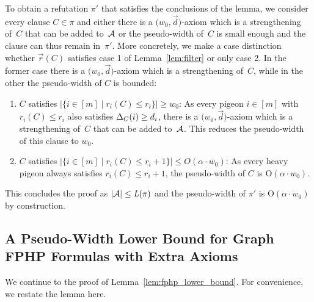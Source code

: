 \documentclass{article}
\newcommand{\bigoh}[1]{\mathrm{O} ( #1 )}
\newcommand{\N}         {\mathbb{N}}
\providecommand{\abs}[1]{\lvert#1\rvert}
\providecommand{\Abs}[1]{\bigl\lvert#1\bigr\rvert}
\newcommand{\set}[1]{\{ #1 \}}
\newcommand{\setdescr}[3][\mid]{\set{ #2 #1 #3 }}
\newcommand{\setsize}[1]{\lvert#1\rvert}
\newcommand{\disjointunion}{\overset{.}{\cup}}
\newcommand{\reflem}[1]{Lemma~\ref{#1}}
\newenvironment{restatablelem}[1]
  {\renewcommand\theinnercustomthm{#1}\innercustomthm}
  {\endinnercustomthm}
\newcommand{\refpi}{\pi}
\newcommand{\genericformsmall}[2]{\mathit{#1}( #2 )}
\newcommand{\length}[1]{\genericformsmall{L}{#1}}
\newcommand{\width}[2][]{\genericformsmall{W_{#1}}{#2}}
\newcommand{\formulaformat}[1]{\mathit{#1}}
\newcommand{\graphfphpnot}[1][G]{\formulaformat{FPHP}({#1})}
\newcommand{\heavy}{heavy\xspace}
\newcommand{\GFPHP}{G\text{-}FPHP}
\renewcommand{\GFPHP}{\graphfphpnot[G]}
\renewcommand{\deg}[2][XXXXXXXXXXXX]{\Delta_{#1}(#2)}
\newcommand{\diff}{\xi}
\newcommand{\cdiff}{4}
\newcommand{\GdegMax}{\Delta}
\newcommand{\V}[1][]{V_{#1}}
\newcommand{\Vp}{\V[P]}
\newcommand{\Vh}{\V[H]}
\newcommand{\Ax}{\ensuremath\mathcal{A}}
\newcommand{\thr}[1]{ \ensuremath d_{{#1}} }
\newcommand{\vecthr}{\vec{d}}
\newcommand{\vecthrdef}[1]{\vecthr = \left(\thr{1}, \ldots, \thr{#1}\right)}
\newcommand{\adv}[1]{\delta_{{#1}}}
\newcommand{\vecadv}{\vec{\delta}}
\newcommand{\vecadvdef}[1]{\vecadv = \left(\adv{1}, \ldots, \adv{#1}\right)}
\newcommand{\fakeaxiom}{$\bigl( w_0, \vecthr \bigr)$-axiom\xspace}
\newcommand{\pseudowidth}{pseudo-width\xspace}
\newcommand{\PSEUDOWIDTH}{Pseudo-Width\xspace}
\renewcommand{\width}[1]{\ensuremath w_{\vecthr,\vecadv}( #1 )}
\newcommand{\ri}[1]{r_{#1}}
\newcommand{\riof}[2]{r_{#2}(#1)}
\newcommand{\vecrof}[1]{\vec{r}(#1)}
\newcommand{\squeezesubsection}[1]{\subsection{#1}}
\numberwithin{equation}{section}
\begin{document}
To obtain a refutation $\refpi'$ that satisfies the conclusions of the lemma,
we consider every clause $C \in \refpi$ and either there is a
\fakeaxiom which is a strengthening of~$C$ that can be added to~$\Ax$ or
the \pseudowidth of~$C$ is small enough and the clause can thus remain
in~$\refpi'$.  More concretely, we make a case distinction whether
$\vecrof{C}$ satisfies case 1 of \reflem{lem:filter} or only case
2. In the former case
there is a \fakeaxiom which is a strengthening of~$C$, while in the
other
the \pseudowidth of $C$ is bounded: \begin{enumerate}
  \item
    $C$ satisfies 
    $\Abs{ \setdescr{ i \in [m]}{ \riof{C}{i} \le \ri{i} } } \ge
    w_0$: As every pigeon $i \in [m]$
    with $\riof{C}{i} \le \ri{i}$
    also satisfies $\deg[C]{i} \ge \thr{i}$, there is a \fakeaxiom
    which is a strengthening of~$C$ that can be added to~$\Ax$. This
    reduces the \pseudowidth of this clause to $w_0$.
  \item
    $C$ satisfies 
    $\Abs{ \setdescr{ i \in [m] }{ \riof{C}{i} \le \ri{i} + 1 } } \le
    O(\alpha \cdot w_0)$:  As every \heavy pigeon always
    satisfies $\riof{C}{i} \le \ri{i} + 1$, the \pseudowidth of $C$ is
    $\bigoh{\alpha \cdot w_0}$.
\end{enumerate}
This concludes the proof as 
$\setsize{\Ax} \leq \length{\refpi}$ 
and the \pseudowidth of $\refpi'$ is
$\bigoh{\alpha \cdot w_0}$ by construction.


\squeezesubsection{A \PSEUDOWIDTH Lower Bound for
  Graph FPHP Formulas with Extra Axioms}
\label{sec:fphp_lower_bound}

We continue to the proof of \reflem{lem:fphp_lower_bound}. For
convenience, we restate the lemma here.

\end{document}
